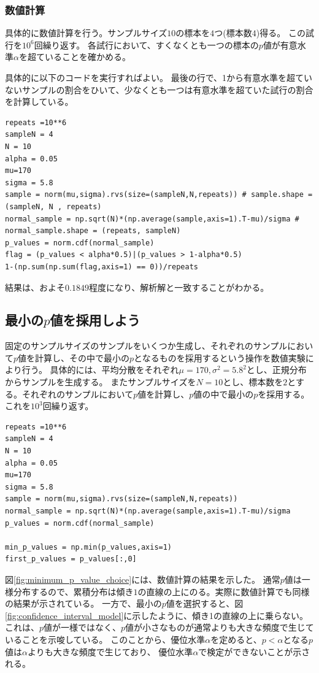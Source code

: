 
\subsubsection{数値計算}
具体的に数値計算を行う。サンプルサイズ$10$の標本を$4$つ(標本数$4$)得る。
この試行を$10^6$回繰り返す。
各試行において、すくなくとも一つの標本の$p$値が有意水準$\alpha$を超ていることを確かめる。

具体的に以下のコードを実行すればよい。
最後の行で、1から有意水準を超ていないサンプルの割合をひいて、少なくとも一つは有意水準を超ていた試行の割合を計算している。
\begin{lstlisting}
repeats =10**6
sampleN = 4
N = 10
alpha = 0.05
mu=170
sigma = 5.8
sample = norm(mu,sigma).rvs(size=(sampleN,N,repeats)) # sample.shape = (sampleN, N , repeats)
normal_sample = np.sqrt(N)*(np.average(sample,axis=1).T-mu)/sigma # normal_sample.shape = (repeats, sampleN)
p_values = norm.cdf(normal_sample)
flag = (p_values < alpha*0.5)|(p_values > 1-alpha*0.5)
1-(np.sum(np.sum(flag,axis=1) == 0))/repeats
\end{lstlisting}
結果は、およそ$0.1849$程度になり、解析解と一致することがわかる。

\subsection{最小の$p$値を採用しよう}
固定のサンプルサイズのサンプルをいくつか生成し、それぞれのサンプルにおいて$p$値を計算し、その中で最小の$p$となるものを採用するという操作を数値実験により行う。
具体的には、平均分散をそれぞれ$\mu=170,\sigma^2=5.8^2$とし、正規分布からサンプルを生成する。
またサンプルサイズを$N=10$とし、標本数を$2$とする。それぞれのサンプルにおいて$p$値を計算し、$p$値の中で最小の$p$を採用する。
これを$10^3$回繰り返す。

\begin{lstlisting}
repeats =10**6
sampleN = 4
N = 10
alpha = 0.05
mu=170
sigma = 5.8
sample = norm(mu,sigma).rvs(size=(sampleN,N,repeats)) 
normal_sample = np.sqrt(N)*(np.average(sample,axis=1).T-mu)/sigma
p_values = norm.cdf(normal_sample)

min_p_values = np.min(p_values,axis=1)
first_p_values = p_values[:,0]
\end{lstlisting}

図\ref{fig:minimum_p_value_choice}には、数値計算の結果を示した。
通常$p$値は一様分布するので、累積分布は傾き$1$の直線の上にのる。実際に数値計算でも同様の結果が示されている。
一方で、最小の$p$値を選択すると、図\ref{fig:confidence_interval_model}に示したように、傾き1の直線の上に乗らない。
これは、$p$値が一様ではなく、$p$値が小さなものが通常よりも大きな頻度で生じていることを示唆している。
このことから、優位水準$\alpha$を定めると、$p<\alpha$となる$p$値は$\alpha$よりも大きな頻度で生じており、
優位水準$\alpha$で検定ができないことが示される。

